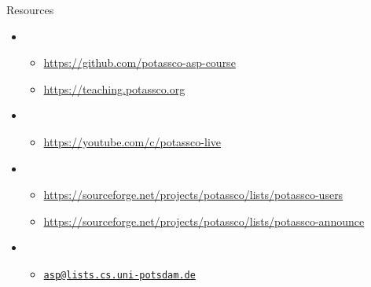 \begin{frame}{Resources}
  \bigskip
  \begin{itemize}
  \item {}
    \begin{itemize}
    \item \url{https://github.com/potassco-asp-course}
    \item \url{https://teaching.potassco.org}
    \end{itemize}
    \smallskip
  \item {}
    \begin{itemize}
    \item \url{https://youtube.com/c/potassco-live}
    \end{itemize}
    \smallskip
  \item {}
    \begin{itemize}
    \item \scriptsize\url{https://sourceforge.net/projects/potassco/lists/potassco-users}
    \item \scriptsize\url{https://sourceforge.net/projects/potassco/lists/potassco-announce}
    \end{itemize}
    \bigskip
  \item {}
    \begin{itemize}
    \item \href{mailto:asp@lists.cs.uni-potsdam.de}{\texttt{asp@lists.cs.uni-potsdam.de}}
    \end{itemize}
  \end{itemize}
\end{frame}
%
